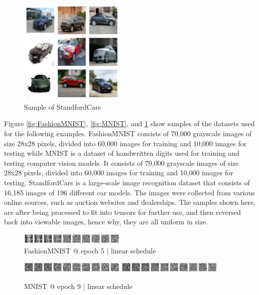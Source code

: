 \documentclass[conference]{IEEEtran}
\begin{document}
\begin{figure}[htbp]
    \centering
    \includegraphics[width=0.45\textwidth]{../images/cars.png}
    \caption{Sample of StandfordCars}
    \label{fig:CARS}
\end{figure}

Figure \ref{fig:FashionMNIST}, \ref{fig:MNIST}, and \ref{fig:CARS} show samples of the datasets
used for the following examples. FashionMNIST consists of 70,000 grayscale images of size 28x28 pixels,
divided into 60,000 images for training and 10,000 images for testing while
MNIST is a dataset of handwritten digits used for training and testing computer
vision models. It consists of 70,000 grayscale images of size 28x28 pixels,
divided into 60,000 images for training and 10,000 images for testing. StandfordCars is a large-scale image recognition dataset that consists of 16,185 images of 196 different car models. The images were collected from various online sources, such as auction websites and dealerships. The samples shown here, are after being processed to fit into tensors for further use, and then reversed back into viewable images, hence why, they are all uniform in size.

\begin{figure}[htbp]
    \centering
    \includegraphics[width=0.45\textwidth]{../images/epoch5.png}
    \caption{FashionMNIST @ epoch 5 | linear schedule}
    \label{fig:epo5}
\end{figure}

\begin{figure}[htbp]
    \centering
    \includegraphics[width=0.45\textwidth]{../images/epoch9-0.png}
    \includegraphics[width=0.45\textwidth]{../images/epoch9-1.png}
    \caption{MNIST @ epoch 9 | linear schedule}
    \label{fig:epo9}
\end{figure}
\end{document}
